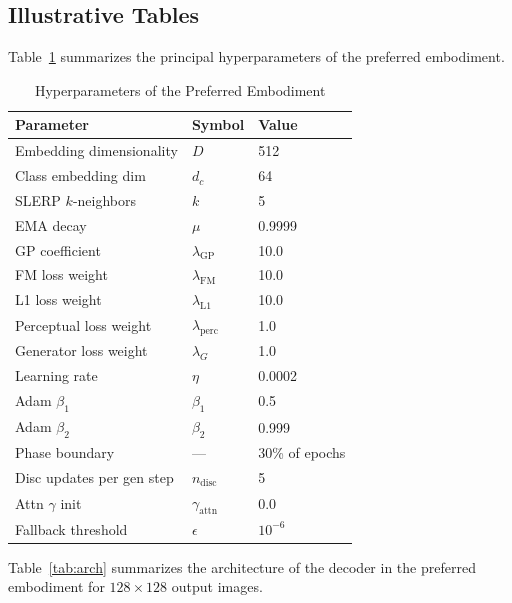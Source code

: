 \documentclass[12pt,letterpaper]{article}
\begin{document}
\subsection{Illustrative Tables}

Table~\ref{tab:hyper} summarizes the principal hyperparameters of the preferred
embodiment.

\begin{table}[H]
\centering
\caption{Hyperparameters of the Preferred Embodiment}
\label{tab:hyper}
\begin{tabular}{lll}
\toprule
\textbf{Parameter} & \textbf{Symbol} & \textbf{Value} \\
\midrule
Embedding dimensionality  & $D$                       & 512 \\
Class embedding dim       & $d_c$                     & 64  \\
SLERP $k$-neighbors       & $k$                       & 5   \\
EMA decay                 & $\mu$                     & 0.9999 \\
GP coefficient            & $\lambda_{\text{GP}}$     & 10.0 \\
FM loss weight            & $\lambda_{\text{FM}}$     & 10.0 \\
L1 loss weight            & $\lambda_{\text{L1}}$     & 10.0 \\
Perceptual loss weight    & $\lambda_{\text{perc}}$   & 1.0 \\
Generator loss weight     & $\lambda_G$               & 1.0 \\
Learning rate             & $\eta$                    & 0.0002 \\
Adam $\beta_1$            & $\beta_1$                 & 0.5 \\
Adam $\beta_2$            & $\beta_2$                 & 0.999 \\
Phase boundary            & —                         & 30\% of epochs \\
Disc updates per gen step & $n_{\text{disc}}$         & 5 \\
Attn $\gamma$ init        & $\gamma_{\text{attn}}$    & 0.0 \\
Fallback threshold        & $\epsilon$                & $10^{-6}$ \\
\bottomrule
\end{tabular}
\end{table}

Table~\ref{tab:arch} summarizes the architecture of the decoder in the
preferred embodiment for $128 \times 128$ output images.
\end{document}
